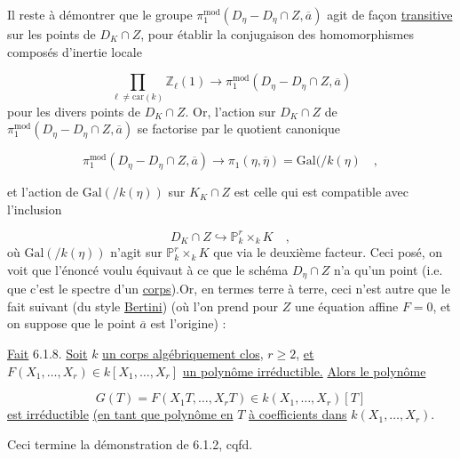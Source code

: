 Il reste à démontrer que le groupe $\pi_1^{\mathrm{mod}}(D_{\eta}-D_{\eta} \cap Z, \overline{a})$ agit de façon \underline{transitive} sur les points de $D_K \cap Z$, pour établir la conjugaison des homomorphismes composés d'inertie locale

\begin{equation*}
\prod_{\ell \neq \mathrm{car}(k)} \mathbb{Z}_{\ell}(1) \longrightarrow \pi_1^{\mathrm{mod}}(D_{\eta} - D_{\eta} \cap Z, \overline{a})
\end{equation*}
pour les divers points de $D_K \cap Z$. Or, l'action sur $D_K \cap Z$ de $\pi_1^{\mathrm{mod}}(D_{\eta} - D_{\eta} \cap Z, \overline{a})$ se factorise par le quotient canonique

\begin{equation*}
\pi_1^{\mathrm{mod}}(D_{\eta} - D_{\eta} \cap Z, \overline{a}) \longrightarrow \pi_1(\eta, \overline{\eta}) = \mathrm{Gal}(/k(\eta) \quad , 
\end{equation*}


 et l'action de $\mathrm{Gal}(/k(\eta))$ sur $K_K \cap Z$ est celle qui est compatible avec l'inclusion

\begin{equation*}
D_K \cap Z \hookrightarrow \mathbb{P}^r_k \times_k K \quad ,
\end{equation*}
où $\mathrm{Gal}(/k(\eta))$ n'agit sur $\mathbb{P}^r_k \times_k K$ que via le deuxième facteur. Ceci posé, on voit que l'énoncé voulu équivaut à ce que le schéma $D_{\eta} \cap Z$ n'a qu'un point (i.e. que c'est le spectre d'un \underline{corps}).Or, en termes terre à terre, ceci n'est autre que le fait suivant (du style \underline{Bertini}) (où l'on prend pour $Z$ une équation affine $F = 0$, et on suppose que le point $\overline{a}$ est l'origine) :

\underline{Fait} 6.1.8. \underline{Soit} $k$ \underline{un corps algébriquement clos}, $r \geq 2$, \underline{et} $F(X_1,\ldots,X_r) \in k[X_1,\ldots,X_r]$ \underline{un polynôme irréductible.} \underline{Alors le polynôme}

\begin{equation*}
G(T) = F (X_1 T,\ldots,X_r T) \in k (X_1,\ldots,X_r)[T]
\end{equation*}
\underline{est irréductible} \underline{(en tant que polynôme en} $T$ \underline{à coefficients dans} $k(X_1,\ldots,X_r)$.

Ceci termine la démonstration de 6.1.2, cqfd.

